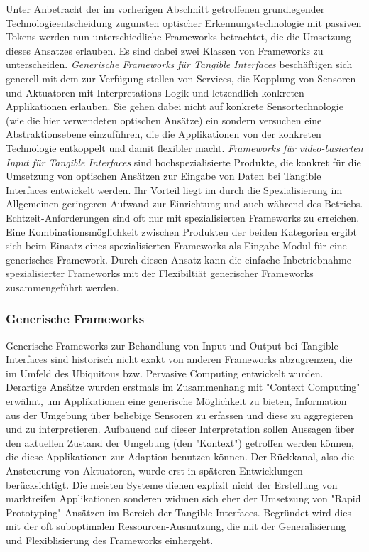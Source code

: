 Unter Anbetracht der im vorherigen Abschnitt getroffenen grundlegender Technologieentscheidung zugunsten optischer Erkennungstechnologie mit passiven Tokens werden nun unterschiedliche Frameworks betrachtet, die die Umsetzung dieses Ansatzes erlauben. Es sind dabei zwei Klassen von Frameworks zu unterscheiden. \emph{Generische Frameworks für Tangible Interfaces} beschäftigen sich generell mit dem zur Verfügung stellen von Services, die Kopplung von Sensoren und Aktuatoren mit Interpretations-Logik und letzendlich konkreten Applikationen erlauben. Sie gehen dabei nicht auf konkrete  Sensortechnologie (wie die hier verwendeten optischen Ansätze) ein sondern versuchen eine Abstraktionsebene einzuführen, die die Applikationen von der konkreten Technologie entkoppelt und damit flexibler macht. \emph{Frameworks für video-basierten Input für Tangible Interfaces} sind hochspezialisierte Produkte, die konkret für die Umsetzung von optischen Ansätzen zur Eingabe von Daten bei Tangible Interfaces entwickelt werden. Ihr Vorteil liegt im durch die Spezialisierung im Allgemeinen geringeren Aufwand zur Einrichtung und auch während des Betriebs. Echtzeit-Anforderungen sind oft nur mit spezialisierten Frameworks zu erreichen. Eine Kombinationsmöglichkeit zwischen Produkten der beiden Kategorien ergibt sich beim Einsatz eines spezialisierten Frameworks als Eingabe-Modul für eine generisches Framework. Durch diesen Ansatz kann die einfache Inbetriebnahme spezialisierter Frameworks mit der Flexibiltiät generischer Frameworks zusammengeführt werden. 

\subsubsection{Generische Frameworks} %
\label{ssub:generische_frameworks}

Generische Frameworks zur Behandlung von Input und Output bei Tangible Interfaces sind historisch nicht exakt von anderen Frameworks abzugrenzen, die im Umfeld des Ubiquitous bzw. Pervasive Computing entwickelt wurden. Derartige Ansätze wurden erstmals im Zusammenhang mit "Context Computing" erwähnt, um Applikationen eine generische Möglichkeit zu bieten, Information aus der Umgebung über beliebige Sensoren zu erfassen und diese zu aggregieren und zu interpretieren. Aufbauend auf dieser Interpretation sollen Aussagen über den aktuellen Zustand der Umgebung (den "Kontext") getroffen werden können, die diese Applikationen zur Adaption benutzen können. Der Rückkanal, also die Ansteuerung von Aktuatoren, wurde erst in späteren Entwicklungen berücksichtigt. Die meisten Systeme dienen explizit nicht der Erstellung von marktreifen Applikationen sonderen widmen sich eher der Umsetzung von "Rapid Prototyping"-Ansätzen im Bereich der Tangible Interfaces. Begründet wird dies mit der oft suboptimalen Ressourcen-Ausnutzung, die mit der Generalisierung und Flexiblisierung des Frameworks einhergeht. 

